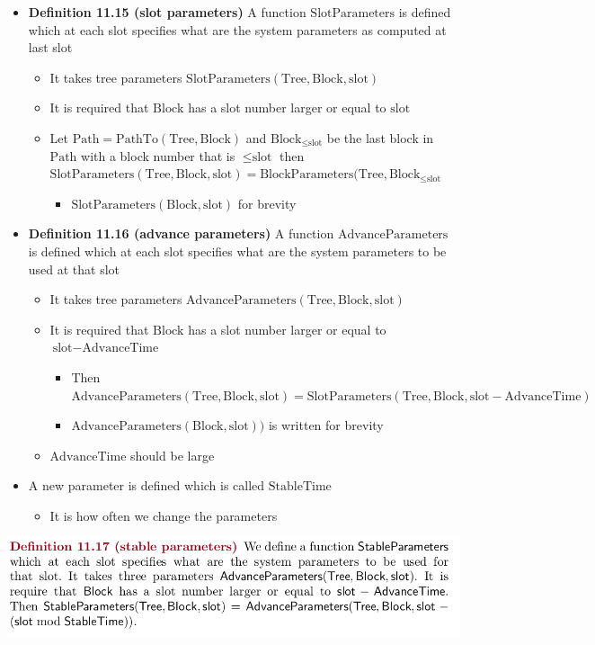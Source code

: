 \documentclass[11pt]{article}
\begin{document}
\begin{itemize}
\item \textbf{Definition 11.15 (slot parameters)} A function \(\text{SlotParameters}\) is defined which at each slot specifies what are the system parameters as computed at last slot
\begin{itemize}
\item It takes tree parameters \(\text{SlotParameters}(\text{Tree}, \text{Block}, \text{slot})\)
\item It is required that \(\text{Block}\) has a slot number larger or equal to \(\text{slot}\)
\item Let \(\text{Path} = \text{PathTo}(\text{Tree}, \text{Block})\) and \(\text{Block}_{\leq \text{slot}}\) be the last block in \(\text{Path}\) with a block number that is \(\leq \text{slot}\) then \(\text{SlotParameters}(\text{Tree}, \text{Block}, \text{slot}) = \text{BlockParameters}(\text{Tree}, \text{Block}_{\leq \text{slot}}\)
\begin{itemize}
\item \(\text{SlotParameters}(\text{Block}, \text{slot})\) for brevity
\end{itemize}
\end{itemize}

\item \textbf{Definition 11.16 (advance parameters)} A function \(\text{AdvanceParameters}\) is defined which at each slot specifies what are the system parameters to be used at that slot
\begin{itemize}
\item It takes tree parameters \(\text{AdvanceParameters}(\text{Tree}, \text{Block}, \text{slot})\)
\item It is required that \(\text{Block}\) has a slot number larger or equal to \(\text{slot} - \text{AdvanceTime}\)
\begin{itemize}
\item Then \(\text{AdvanceParameters}(\text{Tree}, \text{Block}, \text{slot}) = \text{SlotParameters}(\text{Tree}, \text{Block}, \text{slot} - \text{AdvanceTime})\)
\item \(\text{AdvanceParameters}(\text{Block}, \text{slot}))\) is written for brevity
\end{itemize}
\item \(\text{AdvanceTime}\) should be large
\end{itemize}

\item A new parameter is defined which is called \(\text{StableTime}\)
\begin{itemize}
\item It is how often we change the parameters
\end{itemize}
\end{itemize}
\begin{center}
\includegraphics[width=.9\linewidth]{Blockchains (11)/screenshot_2018-10-30_21-26-39.png}
\end{center}
\end{document}
